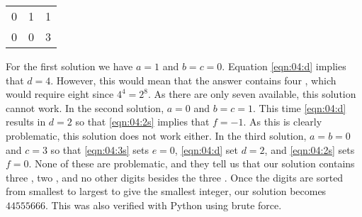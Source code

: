 \documentclass{article}
\begin{document}
{\begin{center}
\begin{tabular}{ccc}
      0 & 1 & 1 \\
      0 & 0 & 3
    \end{tabular}
  \end{center}
  For the first solution we have $a = 1$ and $b = c = 0$.
  Equation \eqref{eqn:04:d} implies that $d = 4$.
  However, this would mean that the answer contains four , which would require eight  since $4^4 = 2^8$.
  As there are only seven  available, this solution cannot work.
  In the second solution, $a = 0$ and $b = c = 1$.
  This time \eqref{eqn:04:d} results in $d = 2$ so that \eqref{eqn:04:2s} implies that $f = -1$.
  As this is clearly problematic, this solution does not work either.
  In the third solution, $a = b = 0$ and $c = 3$ so that \eqref{eqn:04:3s} sets $e = 0$, \eqref{eqn:04:d} set $d = 2$, and \eqref{eqn:04:2s} sets $f = 0$.
  None of these are problematic, and they tell us that our solution contains three , two , and no other digits besides the three .
  Once the digits are sorted from smallest to largest to give the smallest integer, our solution becomes $44555666$.
  This was also verified with Python using brute force.
}
\end{document}
